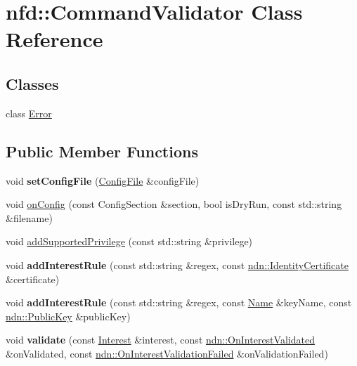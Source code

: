 \hypertarget{classnfd_1_1CommandValidator}{}\section{nfd\+:\+:Command\+Validator Class Reference}
\label{classnfd_1_1CommandValidator}
\subsection*{Classes}
\begin{DoxyCompactItemize}
\item 
class \hyperlink{classnfd_1_1CommandValidator_1_1Error}{Error}
\end{DoxyCompactItemize}
\subsection*{Public Member Functions}
\begin{DoxyCompactItemize}
\item 
void {\bfseries set\+Config\+File} (\hyperlink{classnfd_1_1ConfigFile}{Config\+File} \&config\+File)\hypertarget{classnfd_1_1CommandValidator_ac50da248251173556c7c2c11a6ba373a}{}\label{classnfd_1_1CommandValidator_ac50da248251173556c7c2c11a6ba373a}

\item 
void \hyperlink{classnfd_1_1CommandValidator_af229d8cefc38d313d6fd3da492c0084b}{on\+Config} (const Config\+Section \&section, bool is\+Dry\+Run, const std\+::string \&filename)
\item 
void \hyperlink{classnfd_1_1CommandValidator_a51f6397aaaab1b05a5e38cd03c549280}{add\+Supported\+Privilege} (const std\+::string \&privilege)
\item 
void {\bfseries add\+Interest\+Rule} (const std\+::string \&regex, const \hyperlink{classndn_1_1IdentityCertificate}{ndn\+::\+Identity\+Certificate} \&certificate)\hypertarget{classnfd_1_1CommandValidator_a8803d353b5868658ae19afebf67f1c43}{}\label{classnfd_1_1CommandValidator_a8803d353b5868658ae19afebf67f1c43}

\item 
void {\bfseries add\+Interest\+Rule} (const std\+::string \&regex, const \hyperlink{classndn_1_1Name}{Name} \&key\+Name, const \hyperlink{classndn_1_1PublicKey}{ndn\+::\+Public\+Key} \&public\+Key)\hypertarget{classnfd_1_1CommandValidator_a7842431c0ffbdda4f3032362f41b195b}{}\label{classnfd_1_1CommandValidator_a7842431c0ffbdda4f3032362f41b195b}

\item 
void {\bfseries validate} (const \hyperlink{classndn_1_1Interest}{Interest} \&interest, const \hyperlink{namespacendn_a90fe4b4d97a7870d87f2fce8fdc88f95}{ndn\+::\+On\+Interest\+Validated} \&on\+Validated, const \hyperlink{namespacendn_a6cb4f04de7c1e8da06d8f5865b3d2877}{ndn\+::\+On\+Interest\+Validation\+Failed} \&on\+Validation\+Failed)\hypertarget{classnfd_1_1CommandValidator_a36ed252d40b07e95fca035662918c42b}{}\label{classnfd_1_1CommandValidator_a36ed252d40b07e95fca035662918c42b}

\end{DoxyCompactItemize}


